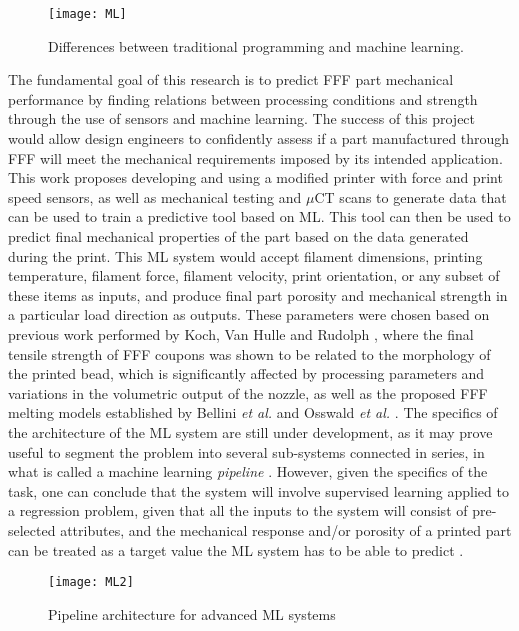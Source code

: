 \documentclass[main.tex]{subfiles}
\begin{document}
\begin{figure}[!htbp]
	\center
	\texttt{[image: ML]}
	\caption{Differences between traditional programming and machine learning. \cite{Chollet2018}} \label{fig:MLvsP}
\end{figure}

The fundamental goal of this research is to predict FFF part mechanical performance by finding relations between processing conditions and strength through the use of sensors and machine learning. The success of this project would allow design engineers to confidently assess if a part manufactured through FFF will meet the mechanical requirements imposed by its intended application. This work proposes developing and using a modified printer with force and print speed sensors, as well as mechanical testing and $\mu$CT scans to generate data that can be used to train a predictive tool based on ML. This tool can then be used to predict final mechanical properties of the part based on the data generated during the print. This ML system would accept filament dimensions, printing temperature, filament force, filament velocity, print orientation, or any subset of these items as inputs, and produce final part porosity and mechanical strength in a particular load direction as outputs. These parameters were chosen based on previous work performed by Koch, Van Hulle and Rudolph \cite{Koch2017}, where the final tensile strength of FFF coupons was shown to be related to the morphology of the printed bead, which is significantly affected by processing parameters and variations in the volumetric output of the nozzle, as well as the proposed FFF melting models established by Bellini \emph{et al.} \cite{Bellini2004} and Osswald \emph{et al.} \cite{OsswaldMelting18}. The specifics of the architecture of the ML system are still under development, as it may prove useful to segment the problem into several sub-systems connected in series, in what is called a machine learning \emph{pipeline} \cite{Geron2019}. However, given the specifics of the task, one can conclude that the system will involve supervised learning applied to a regression problem, given that all the inputs to the system will consist of pre-selected attributes, and the mechanical response and/or porosity of a printed part can be treated as a target value the ML system has to be able to predict \cite{Mohammed2017}.

\begin{figure}[!htbp]
	\center
	\texttt{[image: ML2]}
	\caption{Pipeline architecture for advanced ML systems \cite{Geron2019}} \label{fig:pipeline}
\end{figure}
\end{document}
